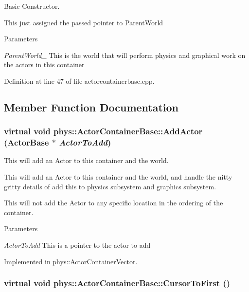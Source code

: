 Basic Constructor. 

This just assigned the passed pointer to ParentWorld 
\begin{DoxyParams}{Parameters}
\item[{\em ParentWorld\_\-}]This is the world that will perform physics and graphical work on the actors in this container \end{DoxyParams}


Definition at line 47 of file actorcontainerbase.cpp.



\subsection{Member Function Documentation}
\hypertarget{classphys_1_1ActorContainerBase_a8dd213cba4915f68ac421fc9f341cbbe}{
\subsubsection[{AddActor}]{\setlength{\rightskip}{0pt plus 5cm}virtual void phys::ActorContainerBase::AddActor ({\bf ActorBase} $\ast$ {\em ActorToAdd})}}
\label{d1/d00/classphys_1_1ActorContainerBase_a8dd213cba4915f68ac421fc9f341cbbe}


This will add an Actor to this container and the world. 

This will add an Actor to this container and the world, and handle the nitty gritty details of add this to physics subsystem and graphics subsystem. \par
\par
 This will not add the Actor to any specific location in the ordering of the container. 
\begin{DoxyParams}{Parameters}
\item[{\em ActorToAdd}]This is a pointer to the actor to add \end{DoxyParams}


Implemented in \hyperlink{classphys_1_1ActorContainerVector_a4bc3e38f16caddee021a97739bebaf6e}{phys::ActorContainerVector}.

\hypertarget{classphys_1_1ActorContainerBase_ab1a44758d7c17e70ff2e0f8de47424c3}{
\subsubsection[{CursorToFirst}]{\setlength{\rightskip}{0pt plus 5cm}virtual void phys::ActorContainerBase::CursorToFirst ()}}
\label{d1/d00/classphys_1_1ActorContainerBase_ab1a44758d7c17e70ff2e0f8de47424c3}


